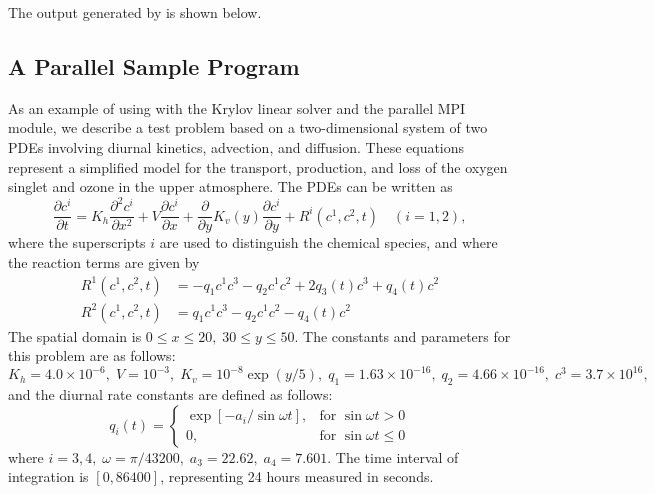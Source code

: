The output generated by  is shown below.
{\small}


\subsection{A Parallel Sample Program}\label{ss:parallel_sim_ex}

As an example of using {\cvodes} with the Krylov linear solver {\cvspgmr}
and the parallel MPI {\nvecp} module, we describe 
a test problem based on a two-dimensional system of two PDEs involving
diurnal kinetics, advection, and diffusion. 
These equations represent a simplified model for the transport, production,
and loss of the oxygen singlet and ozone in the upper atmosphere.
The PDEs can be written as 
\begin{equation}\label{e:pvkx:pde}
  \frac{\partial c^i}{\partial t}=K_h\frac{\partial^2 c^i}{\partial x^2}
  +V \frac{\partial c^i}{\partial x}
  + \frac{\partial} {\partial y} K_v(y) \frac{\partial c^i}{\partial y}
  + R^i(c^1,c^2,t) \quad (i=1,2),
\end{equation}
where the superscripts $i$ are used to distinguish the chemical species, and
where the reaction terms are given by 
\begin{equation}\label{e:pvkx:r}
\begin{split}
  R^1(c^1,c^2,t) & = -q_1c^1c^3-q_2c^1c^2+2q_3(t)c^3+q_4(t)c^2 \\
  R^2(c^1,c^2,t) & = q_1c^1c^3-q_2c^1c^2-q_4(t)c^2
\end{split}
\end{equation}
The spatial domain is $0 \leq x \leq 20,\;30 \leq y \leq 50$. The constants
and parameters for this problem are as follows: $K_h=4.0\times
10^{-6},\;V=10^{-3},\;K_v=10^{-8}\exp (y/5),\;q_1=1.63\times
10^{-16},\;q_2=4.66\times 10^{-16},\;c^3=3.7\times 10^{16},$ and the diurnal
rate constants are defined as follows: 
\begin{equation*}
q_i(t) = 
\begin{cases}
\exp [-a_i/\sin \omega t], & \mbox{for }\sin \omega t>0 \\
0, & \mbox{for }\sin \omega t\leq 0
\end{cases}
\end{equation*}
where $i=3,4,\;\omega =\pi /43200,\;a_3=22.62,\;a_4=7.601.$
The time interval of integration is $[0, 86400]$, representing 24
hours measured in seconds.

